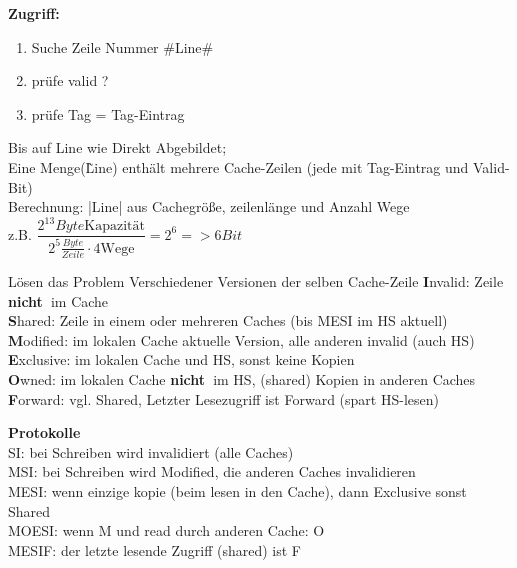 \textbf{Zugriff: }
\begin{enumerate}
\item Suche Zeile Nummer \#Line\#
\item prüfe valid ?
\item prüfe Tag = Tag-Eintrag
\end{enumerate}

Bis auf Line wie Direkt Abgebildet; \\
Eine Menge(\~ Line) enthält mehrere Cache-Zeilen (jede mit Tag-Eintrag und Valid-Bit)\\
Berechnung:  |Line| aus Cachegröße, zeilenlänge und Anzahl Wege \\
z.B. $ \dfrac{2^{13} Byte \text{Kapazität}}{2^5 \frac{Byte}{Zeile} \cdot 4 \text{Wege}} = 2^6 => 6 Bit $ 

\newcommand{\nee}{\textbf{nicht~}}

Lösen das Problem Verschiedener Versionen der selben Cache-Zeile
\textbf{I}nvalid: Zeile \nee im Cache\\
\textbf{S}hared: Zeile in einem oder mehreren Caches (bis MESI im HS aktuell)\\
\textbf{M}odified: im lokalen Cache aktuelle Version, alle anderen invalid (auch HS)\\
\textbf{E}xclusive: im lokalen Cache und HS, sonst keine Kopien\\
\textbf{O}wned: im lokalen Cache  \nee im HS, (shared) Kopien in anderen Caches\\
\textbf{F}orward: vgl. Shared, Letzter Lesezugriff ist Forward (spart HS-lesen)

\textbf{Protokolle}\\
SI: bei Schreiben wird invalidiert (alle Caches)\\
MSI: bei Schreiben wird Modified, die anderen Caches invalidieren\\
MESI: wenn einzige kopie (beim lesen in den Cache), dann Exclusive sonst Shared\\
MOESI: wenn M und read durch anderen Cache: O \\
MESIF: der letzte lesende Zugriff (shared) ist F